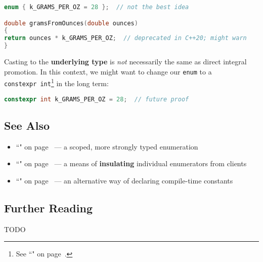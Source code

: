 \begin{lstlisting}[language=C++]
enum { k_GRAMS_PER_OZ = 28 };  // not the best idea

double gramsFromOunces(double ounces)
{
return ounces * k_GRAMS_PER_OZ;  // deprecated in C++20; might warn
}
\end{lstlisting}

\noindent Casting to the \textbf{underlying type} is \emph{not} necessarily the
same as direct integral promotion. In this context, we might want to
change our \texttt{enum} to a
\texttt{constexpr}~\texttt{int}{\cprotect\footnote{See
``" on page~\pageref{constexprvar}.}} in the long
term:

\begin{lstlisting}[language=C++]
constexpr int k_GRAMS_PER_OZ = 28;  // future proof
\end{lstlisting}


\subsection[See Also]{See Also}\label{see-also}

\begin{itemize}
\item{``" on page~\pageref{enumclass} — a scoped, more strongly typed enumeration}
\item{``" on page~\pageref{enumopaque} — a means of \textbf{insulating} individual enumerators from clients}
\item{``" on page~\pageref{constexprvar} — an alternative way of declaring compile-time constants}
\end{itemize}

\subsection[Further Reading]{Further Reading}\label{further-reading}

TODO


